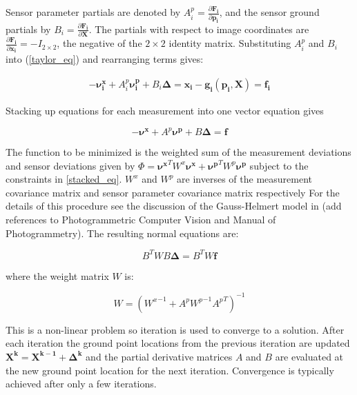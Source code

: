 \documentclass[]{article}
\newcommand{\imgmeas}{\pmb{x_{i}}}
\newcommand{\grnd}{\pmb{X}}
\newcommand{\sensmeas}{\pmb{p_i}}
\newcommand{\imgnu}{\pmb{\nu_{i}^x}}
\newcommand{\sensnu}{\pmb{\nu_i^p}}
\newcommand{\grndupdate}{\pmb{\Delta}}
\newcommand{\Fimgpartials}{\frac{\partial{\pmb{F_{i}}}}{\partial{\imgmeas}}}
\newcommand{\Fgrndpartials}{\frac{\partial{\pmb{F_{i}}}}{\partial{\grnd}}}
\newcommand{\Fsenspartials}{\frac{\partial{\pmb{F_{i}}}}{\partial{\sensmeas}}}
\begin{document}
Sensor parameter partials are denoted by $A_{i}^p = \Fsenspartials$, and the sensor ground partials by $B_{i} = \Fgrndpartials$.  The partials with respect to image coordinates are ${\Fimgpartials=-I_{2 \times 2}}$, the negative of the $2 \times 2$ identity matrix.  Substituting $A_{i}^p$ and $B_{i}$ into (\ref{taylor_eq}) and rearranging terms gives:

\begin{equation} \label{linear_eq}
\begin{split}
-\imgnu + A_{i}^p\sensnu + B_{i}\grndupdate = \imgmeas - \pmb{g_i}(\sensmeas, \grnd) = \pmb{f_{i}}
\end{split}
\end{equation}

Stacking up equations for each measurement into one vector equation gives

\begin{equation}\label{stacked_eq}
-\pmb{\nu^x} + A^p\pmb{\nu^p} + B\grndupdate = \pmb{f}
\end{equation}

The function to be minimized is the weighted sum of the measurement deviations and sensor deviations given by $\Phi = \pmb{\nu^x}^T W^x \pmb{\nu^x} + \pmb{\nu^p}^T W^p \pmb{\nu^p}$ subject to the constraints in \ref{stacked_eq}.  $W^x$ and $W^p$ are inverses of the measurement covariance matrix and sensor parameter covariance matrix respectively  For the details of this procedure see the discussion of the Gauss-Helmert model in (add references to Photogrammetric Computer Vision and Manual of Photogrammetry).  The resulting normal equations are:

\begin{equation} \label{normal_eq}
B^T W B\pmb{\Delta} = B^T W \pmb{f}
\end{equation}

where the weight matrix $W$ is:

\begin{equation}\label{weight_eq}
W = ({W^x}^{-1} + A^p {W^p}^{-1} {A^p}^T)^{-1}
\end{equation}

This is a non-linear problem so iteration is used to converge to a solution.  After each iteration the ground point locations from the previous iteration are updated $\pmb{X^k} = \pmb{X^{k - 1}} + \pmb{\Delta^k}$  and the partial derivative matrices $A$ and $B$ are evaluated at the new ground point location for the next iteration.  Convergence is typically achieved after only a few iterations.  
\end{document}
